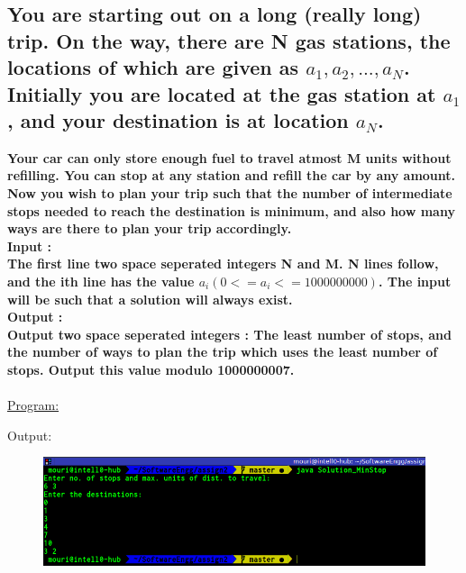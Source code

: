 \documentclass[a4paper,11pt]{article}
\begin{document}
\subsection{You are starting out on a long (really long) trip. On the way, there are N gas stations, the locations of which are given as $a_1,a_2,...,a_N$. Initially you are located at the gas station at $a_1$, and your destination is at location $a_N$.} \textbf{\large Your car can only store enough fuel to travel atmost M units without refilling. You can stop at any station and refill the car by any amount. Now you wish to plan your trip such that the number of intermediate stops needed to reach the destination is minimum, and also how many ways are there to plan your trip accordingly.\\
Input :\\
The first line two space seperated integers N and M. N lines follow, and the ith line has the value $a_i (0 <= a_i <= 1000000000)$. The input will be such that a solution will always exist.\\
Output :\\
Output two space seperated integers : The least number of stops, and the number of ways to plan the trip which uses the least number of stops. Output this value modulo 1000000007.\\}\\
\underline{Program:}

Output:
\begin{figure}[H]
\centering
\includegraphics[width=350pt,height=\textheight,keepaspectratio]{./pics/Java/3.png}
\end{figure}

\bigskip
\end{document}
